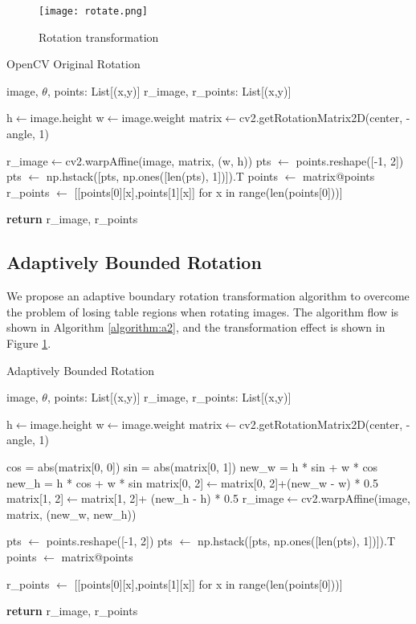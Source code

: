 \documentclass{article}
\begin{document}
\begin{figure}
    \centering
    \texttt{[image: rotate.png]}
    \caption{Rotation transformation}
    \label{fig:Rotate}
\end{figure}

\begin{algorithm}
\caption{OpenCV Original Rotation}
\begin{algorithmic}[1]
\Require image, $\theta$, points: List[(x,y)]
\Ensure r\_image, r\_points: List[(x,y)]

\State h$\gets$image.height
\State w$\gets$image.weight
\State matrix$\gets$cv2.getRotationMatrix2D(center, -angle, 1)

\State r_image$\gets$cv2.warpAffine(image, matrix, (w, h))
\State pts $\gets$ points.reshape([-1, 2])
\State pts $\gets$ np.hstack([pts, np.ones([len(pts), 1])]).T
\State points $\gets$ matrix@points
\State r_points $\gets$ [[points[0][x],points[1][x]] for x in range(len(points[0]))]


\State \textbf{return} r\_image, r\_points
\end{algorithmic}
\label{algorithm:a1}
\end{algorithm}

\subsection{Adaptively Bounded Rotation}
We propose an adaptive boundary rotation transformation algorithm to overcome the problem of losing table regions when rotating images. The algorithm flow is shown in Algorithm \ref{algorithm:a2}, and the transformation effect is shown in Figure \ref{fig:Rotate}.


\begin{algorithm}[h]
\caption{Adaptively Bounded Rotation}
\begin{algorithmic}[1]
\Require image, $\theta$, points: List[(x,y)]
\Ensure r\_image, r\_points: List[(x,y)]

\State h$\gets$image.height
\State w$\gets$image.weight
\State matrix$\gets$cv2.getRotationMatrix2D(center, -angle, 1)

\State cos = abs(matrix[0, 0]) 
\State sin = abs(matrix[0, 1])
\State new_w = h * sin + w * cos
\State new_h = h * cos + w * sin
\State matrix[0, 2]$\gets$matrix[0, 2]+(new_w - w) * 0.5
\State matrix[1, 2]$\gets$matrix[1, 2]+ (new_h - h) * 0.5
\State r_image$\gets$cv2.warpAffine(image, matrix, (new\_w, new\_h))


\State pts $\gets$ points.reshape([-1, 2])
\State pts $\gets$ np.hstack([pts, np.ones([len(pts), 1])]).T
\State points $\gets$ matrix@points

\State r_points $\gets$ [[points[0][x],points[1][x]] for x in range(len(points[0]))]


\State \textbf{return} r\_image, r\_points
\end{algorithmic}
\label{algorithm:a2}
\end{algorithm}
\end{document}
